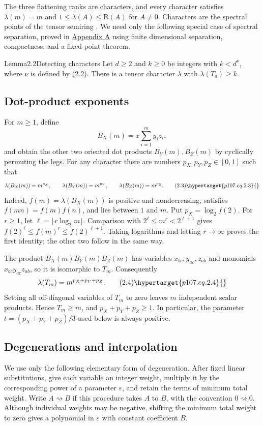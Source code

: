 The three flattening ranks are characters, and every character satisfies $\lambda(m)=m$ and $1\le\lambda(A)\le\mathrm R(A)$ for $A\ne0$. Characters are the spectral points of the tensor semiring \cite{r16,r4}. We need only the following special case of spectral separation, proved in \hyperlink{p107.sec.A}{Appendix A} using finite dimensional separation, compactness, and a fixed-point theorem.

\begin{result}{Lemma}{2.2}{Detecting characters}
Let $d\ge2$ and $k\ge0$ be integers with $k<d^\nu$, where $\nu$ is defined by \hyperlink{p107.eq.2.2}{(2.2)}. There is a tensor character $\lambda$ with $\lambda(T_d)\ge k$.
\end{result}

\subsection{Dot-product exponents}\hypertarget{p107.sec.2.1}{}
For $m\ge1$, define
\[B_X(m)=x\sum_{i=1}^m y_i z_i,\]
and obtain the other two oriented dot products $B_Y(m),B_Z(m)$ by cyclically permuting the legs. For any character there are numbers $p_X,p_Y,p_Z\in[0,1]$ such that
\begin{equation}\lambda(B_X(m))=m^{p_X},\qquad\lambda(B_Y(m))=m^{p_Y},\qquad\lambda(B_Z(m))=m^{p_Z}.\tag{2.3}\hypertarget{p107.eq.2.3}{}\end{equation}
Indeed, $f(m)=\lambda(B_X(m))$ is positive and nondecreasing, satisfies $f(mn)=f(m)f(n)$, and lies between $1$ and $m$. Put $p_X=\log_2 f(2)$. For $r\ge1$, let $\ell=\lfloor r\log_2 m\rfloor$. Comparison with $2^\ell\le m^r<2^{\ell+1}$ gives $f(2)^\ell\le f(m)^r\le f(2)^{\ell+1}$. Taking logarithms and letting $r\to\infty$ proves the first identity; the other two follow in the same way.

The product $B_X(m)B_Y(m)B_Z(m)$ has variables $x_{bc},y_{ac},z_{ab}$ and monomials $x_{bc}y_{ac}z_{ab}$, so it is isomorphic to $T_m$. Consequently
\begin{equation}\lambda(T_m)=m^{p_X+p_Y+p_Z}.\tag{2.4}\hypertarget{p107.eq.2.4}{}\end{equation}
Setting all off-diagonal variables of $T_m$ to zero leaves $m$ independent scalar products. Hence $T_m\ge m$, and $p_X+p_Y+p_Z\ge1$. In particular, the parameter $t=(p_X+p_Y+p_Z)/3$ used below is always positive.

\subsection{Degenerations and interpolation}\hypertarget{p107.sec.2.2}{}
We use only the following elementary form of degeneration. After fixed linear substitutions, give each variable an integer weight, multiply it by the corresponding power of a parameter $\varepsilon$, and retain the terms of minimum total weight. Write $A\rightsquigarrow B$ if this procedure takes $A$ to $B$, with the convention $0\rightsquigarrow0$. Although individual weights may be negative, shifting the minimum total weight to zero gives a polynomial in $\varepsilon$ with constant coefficient $B$.

